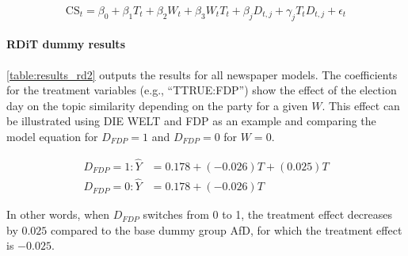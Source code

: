 \documentclass[
  12pt,
]{article}
\begin{document}
\[
\text{CS}_{t}=\beta_0+\beta_1T_t+\beta_2W_{t}+\beta_3W_tT_t+\beta_jD_{t,j}+\gamma_jT_tD_{t,j}+ \epsilon_t
\]

\hypertarget{rdit-dummy-results}{%
\paragraph{RDiT dummy results}\label{rdit-dummy-results}}

\autoref{table:results_rd2} outputs the results for all newspaper
models. The coefficients for the treatment variables (e.g.,
``TTRUE:FDP'') show the effect of the election day on the topic
similarity depending on the party for a given \(W\). This effect can be
illustrated using DIE WELT and FDP as an example and comparing the model
equation for \(D_{FDP} = 1\) and \(D_{FDP} = 0\) for \(W=0\).

\[
\begin{aligned}
D_{FDP} = 1: \hat{Y} &=0.178+(-0.026)T+(0.025)T \\
D_{FDP} = 0: \hat{Y} &=0.178+(-0.026)T
\end{aligned}
\]

In other words, when \(D_{FDP}\) switches from 0 to 1, the treatment
effect decreases by \(0.025\) compared to the base dummy group AfD, for
which the treatment effect is \(-0.025\).
\end{document}
